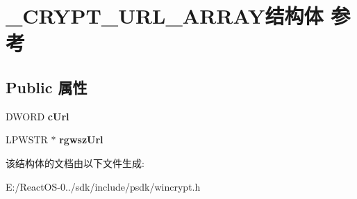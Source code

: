 \hypertarget{struct___c_r_y_p_t___u_r_l___a_r_r_a_y}{}\section{\+\_\+\+C\+R\+Y\+P\+T\+\_\+\+U\+R\+L\+\_\+\+A\+R\+R\+A\+Y结构体 参考}
\label{struct___c_r_y_p_t___u_r_l___a_r_r_a_y}
\subsection*{Public 属性}
\begin{DoxyCompactItemize}
\item 
\mbox{\label{struct___c_r_y_p_t___u_r_l___a_r_r_a_y_ae991a537100742b0b5d151d5b7d8aba0}} 
D\+W\+O\+RD {\bfseries c\+Url}
\item 
\mbox{\label{struct___c_r_y_p_t___u_r_l___a_r_r_a_y_aeb5eef476f238db833c74a0c3acd7fe3}} 
L\+P\+W\+S\+TR $\ast$ {\bfseries rgwsz\+Url}
\end{DoxyCompactItemize}


该结构体的文档由以下文件生成\+:\begin{DoxyCompactItemize}
\item 
E\+:/\+React\+O\+S-\/0../sdk/include/psdk/wincrypt.\+h\end{DoxyCompactItemize}
